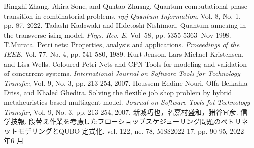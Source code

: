 \def\line{−\hspace*{-.7zw}−}

\begin{thebibliography}{99}

 Bingzhi Zhang, Akira Sone, and Quntao Zhuang. Quantum computational phase transition in combinatorial problems. \textit{npj Quantum Information}, Vol. 8, No. 1, pp. 87, 2022.
 Tadashi Kadowaki and Hidetoshi Nishimori. Quantum anneaing in the transverse ising model. \textit{Phys. Rev. E}, Vol. 58, pp. 5355-5363, Nov 1998.
 T.Murata. Petri nets: Properties, analysis and applications. \textit{Proceedings of the IEEE}, Vol. 77, No. 4, pp. 541-580, 1989.
 Kurt Jenson, Lars Michael Kristensen, and Lisa Wells. Coloured Petri Nets and CPN Tools for modeling and validation of concurrent systems. \textit{International Journal on Software Tools for Technology Transfer}, Vol. 9, No. 3, pp. 213-254, 2007.
 Houssem Eddine Nouri, Olfa Belkahla Driss, and Khaled Ghedira. Solving the flexible job shop problem by hybrid metahcuristics-based multiagent model. \textit{Journal on Software Tools fot Technology Transfar}, Vol. 9, No. 3, pp. 213-254, 2007.
 新城巧也，名嘉村盛和，猪谷宜彦. 信学技報, 段替え作業を考慮したフローショップスケジューリング問題のペトリネットモデリングとQUBO 定式化. vol. 122, no. 78, MSS2022-17, pp. 90-95, 2022 年6 月

\end{thebibliography}
